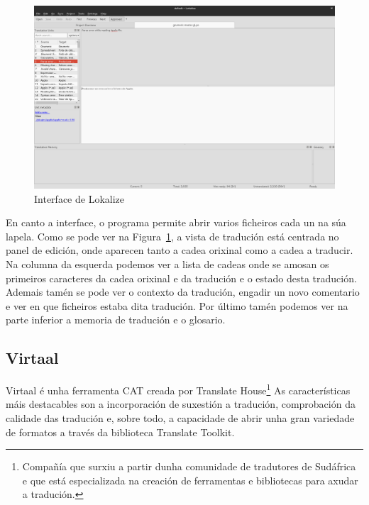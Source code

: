 \begin{figure}[h]
    \centering
    \includegraphics[width=\textwidth]{img/captura_lokalize.png}
    \caption{Interface de Lokalize}
    \label{fig:lokalize}
\end{figure}

En canto a interface, o programa permite abrir varios ficheiros cada un na súa lapela. Como se pode ver na Figura~\ref{fig:lokalize}, a vista de tradución está centrada no panel de edición, onde aparecen tanto a cadea orixinal como a cadea a traducir. Na columna da esquerda podemos ver a lista de cadeas onde se amosan os primeiros caracteres da cadea orixinal e da tradución e o estado desta tradución. Ademais tamén se pode ver o contexto da tradución, engadir un novo comentario e ver en que ficheiros estaba dita tradución. Por último tamén podemos ver na parte inferior a memoria de tradución e o glosario.

\subsection{Virtaal}

Virtaal é unha ferramenta CAT creada por Translate House\footnote{Compañía que surxiu a partir dunha comunidade de tradutores de Sudáfrica e que está especializada na creación de ferramentas e bibliotecas para axudar a tradución.} As características máis destacables son a incorporación de suxestión a tradución, comprobación da calidade das tradución e, sobre todo, a capacidade de abrir unha gran variedade de formatos a través da biblioteca Translate Toolkit.

